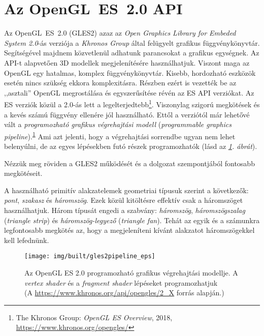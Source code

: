 \documentclass[12pt]{report}
\theoremstyle{definition}
\newcommand{\inenglish}[1]{\textsl{#1}}
\begin{document}
    \section{Az OpenGL~ES~2.0 API}
    \label{sec:GLES2:API}

Az OpenGL~ES~2.0 (GLES2) azaz az \emph{Open Graphics Library for Embeded System
2.0}-ás verziója a \emph{Khronos Group} által felügyelt grafikus
függvénykönyvtár.  Segítségével majdnem közvetlenül adhatunk parancsokat a
grafikus egységnek. Az API-t alapvetően 3D modellek megjelenítésére
használhatjuk. Viszont maga az OpenGL egy hatalmas, komplex függvénykönyvtár.
Kisebb, hordozható eszközök esetén nincs szükség ekkora komplexitásra. Részben
ezért is vezették be az ,,asztali'' OpenGL megrostálása és egyszerűsítése révén
az ES API verziókat. Az ES verziók közül a 2.0-ás lett a
legelterjedtebb\footnote{The Khronos Group: \emph{OpenGL ES Overview}, 2018,
{\footnotesize\url{https://www.khronos.org/opengles/}}\label{fn:GLES2}}.
Viszonylag szigorú megkötések és a kevés számú függvény ellenére jól
használható. Ettől a verziótól már lehetővé vált a \emph{programozható grafikus
végrehajtási modell} (\inenglish{programmable graphics
pipeline}).\textsuperscript{\ref{fn:GLES2}} Ami azt jelenti, hogy a végrehajtási
sorrendbe ugyan nem lehet belenyúlni, de az egyes lépésekben futó részek
programozhatók (lásd az \emph{\ref{fig:opengles_20_pipeline2}. ábrát}).

Nézzük meg röviden a GLES2 működését és a dolgozat szempontjából fontosabb
megkötéseit.

A használható primitív alakzatelemek geometriai típusuk szerint a következők:
\emph{pont}, \emph{szakasz} és \emph{háromszög}. Ezek közül kitöltésre effektív
csak a háromszöget használhatjuk. Három típusát engedi a szabvány:
\emph{háromszög}, \emph{háromszögszalag} (\inenglish{triangle strip}) és
\emph{háromszög-legyező} (\inenglish{triangle fan}). Tehát az egyik és a
számunkra legfontosabb megkötés az, hogy a megjeleníteni kívánt alakzatot
háromszögekkel kell lefednünk.

  \begin{figure}
    \texttt{[image: img/built/gles2pipeline\_eps]}
    \caption{\label{fig:opengles_20_pipeline2} Az OpenGL ES 2.0 programozható
    grafikus végrehajtási modellje. A \emph{vertex shader} és a \emph{fragment
    shader} lépéseket programozhatjuk \\%
    (A {\footnotesize\url{https://www.khronos.org/api/opengles/2_X}}
    forrás alapján.)}
  \end{figure}
\end{document}
